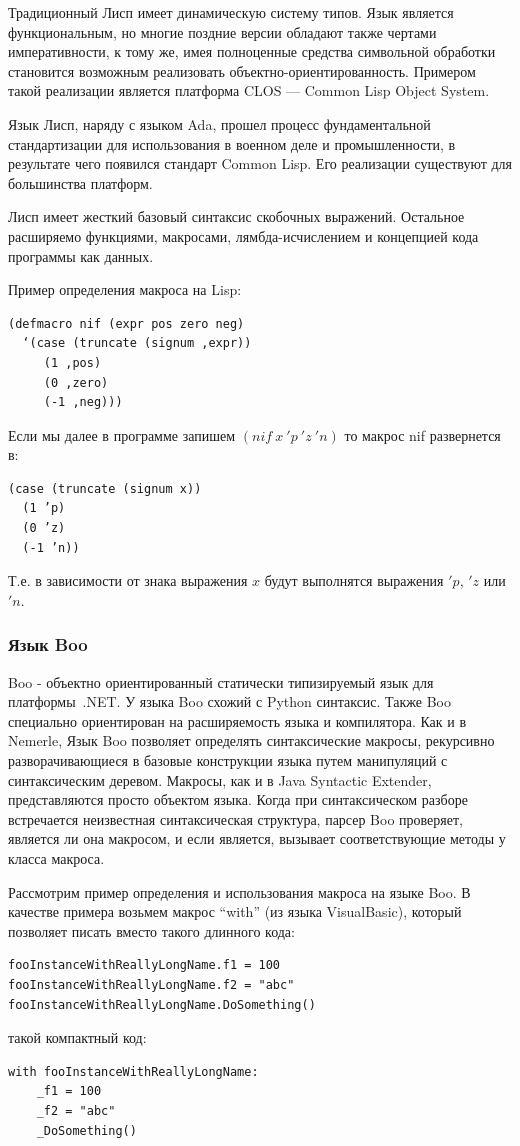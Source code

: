 \documentclass[a4paper,12pt,titlepage]{extarticle}
\begin{document}
Традиционный Лисп имеет динамическую систему типов. Язык является
функциональным, но многие поздние версии обладают также чертами императивности,
к тому же, имея полноценные средства символьной обработки становится возможным
реализовать объектно-ориентированность. Примером такой реализации является
платформа CLOS --- Common Lisp Object System.

Язык Лисп, наряду с языком Ada, прошел процесс фундаментальной стандартизации
для использования в военном деле и промышленности, в результате чего появился
стандарт Common Lisp. Его реализации существуют для большинства платформ.

Лисп имеет жесткий базовый синтаксис скобочных выражений. Остальное расширяемо
функциями, макросами, лямбда-исчислением и концепцией кода программы как
данных.

Пример определения макроса на Lisp:
\begin{verbatim}
(defmacro nif (expr pos zero neg)
  ‘(case (truncate (signum ,expr))
     (1 ,pos)
     (0 ,zero)
     (-1 ,neg)))
\end{verbatim}
Если мы далее в программе запишем $(nif ~ x ~ 'p ~ 'z ~ 'n)$ то макрос nif
развернется в:
\begin{verbatim}
(case (truncate (signum x))
  (1 ’p)
  (0 ’z)
  (-1 ’n))
\end{verbatim}
Т.е. в зависимости от знака выражения $x$ будут выполнятся выражения $'p$, $'z$
или $'n$.

\subsubsection*{Язык Boo}
Boo - объектно ориентированный статически типизируемый язык для платформы~.NET.
У языка Boo схожий с Python синтаксис. Также Boo специально ориентирован на
расширяемость языка и компилятора. Как и в Nemerle, Язык Boo позволяет
определять синтаксические макросы, рекурсивно разворачивающиеся в базовые
конструкции языка путем манипуляций с синтаксическим деревом. Макросы, как и в
Java Syntactic Extender, представляются просто объектом языка. Когда при
синтаксическом разборе встречается неизвестная синтаксическая структура, парсер
Boo проверяет, является ли она макросом, и если является, вызывает
соответствующие методы у класса макроса.

Рассмотрим пример определения и использования макроса на языке Boo. В качестве
примера возьмем макрос ``with'' (из языка VisualBasic), который позволяет писать
вместо такого длинного кода:
\begin{verbatim}
fooInstanceWithReallyLongName.f1 = 100
fooInstanceWithReallyLongName.f2 = "abc"
fooInstanceWithReallyLongName.DoSomething()
\end{verbatim}
такой компактный код:
\begin{verbatim}
with fooInstanceWithReallyLongName:
    _f1 = 100
    _f2 = "abc"
    _DoSomething()
\end{verbatim}
\end{document}
